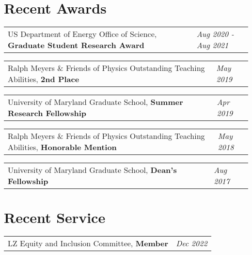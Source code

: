 \documentclass[
  10pt,
  letterpaper,
  DIV=11,
  numbers=noendperiod]{scrartcl}
\begin{document}
\hypertarget{fa-trophy-recent-awards}{%
\section{\texorpdfstring{ Recent
Awards}{ Recent Awards}}\label{fa-trophy-recent-awards}}

\begin{tabularx}{\textwidth}{>{\RaggedRight}p{}  >{\RaggedLeft}X} US Department of Energy Office of Science, \textbf{Graduate Student Research Award} & \textcolor{mygray}{\textit{Aug 2020 - Aug 2021}}  \end{tabularx}

\begin{tabularx}{\textwidth}{>{\RaggedRight}p{}  >{\RaggedLeft}X} Ralph Meyers \& Friends of Physics Outstanding Teaching Abilities, \textbf{2nd Place} & \textcolor{mygray}{\textit{May 2019}}  \end{tabularx}

\begin{tabularx}{\textwidth}{>{\RaggedRight}p{}  >{\RaggedLeft}X} University of Maryland Graduate School, \textbf{Summer Research Fellowship} & \textcolor{mygray}{\textit{Apr 2019}}  \end{tabularx}

\begin{tabularx}{\textwidth}{>{\RaggedRight}p{}  >{\RaggedLeft}X} Ralph Meyers \& Friends of Physics Outstanding Teaching Abilities, \textbf{Honorable Mention} & \textcolor{mygray}{\textit{May 2018}}  \end{tabularx}

\begin{tabularx}{\textwidth}{>{\RaggedRight}p{}  >{\RaggedLeft}X} University of Maryland Graduate School, \textbf{Dean's Fellowship} & \textcolor{mygray}{\textit{Aug 2017}}  \end{tabularx}

\hypertarget{fa-people-carry-recent-service}{%
\section{\texorpdfstring{ Recent
Service}{ Recent Service}}\label{fa-people-carry-recent-service}}

\begin{tabularx}{\textwidth}{>{\RaggedRight}p{}  >{\RaggedLeft}X} LZ Equity and Inclusion Committee, \textbf{Member} & \textcolor{mygray}{\textit{Dec 2022}}  \end{tabularx}
\end{document}
